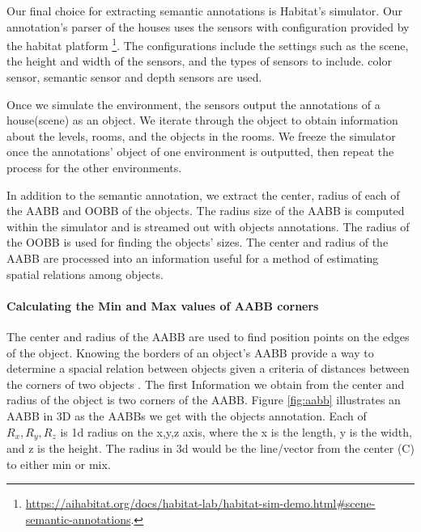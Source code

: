 Our final choice for extracting semantic annotations is Habitat's simulator. Our annotation's parser of the houses uses the sensors with configuration provided by the habitat platform \footnote{\url{https://aihabitat.org/docs/habitat-lab/habitat-sim-demo.html\#scene-semantic-annotations}.}. The configurations include the settings such as the scene, the height and width of the sensors, and the types of sensors to include. color sensor, semantic sensor and depth sensors are used. 

Once we simulate the environment, the sensors output the annotations of a house(scene) as an object. We iterate through the object to obtain information about the levels, rooms, and the objects in the rooms. We freeze the simulator once the annotations' object of one environment is outputted, then repeat the process for the other environments. 

In addition to the semantic annotation, we extract the center, radius of each of the AABB and OOBB of the objects. The radius size of the AABB is computed within the simulator and is streamed out with objects annotations. The radius of the OOBB is used for finding the objects' sizes. The center and radius of the AABB are processed into an information useful for a method of estimating spatial relations among objects. 

\paragraph{Calculating the Min and Max values of AABB corners}

The center and radius of the AABB are used to find position points on the edges of the object. Knowing the borders of an object's AABB provide a way to determine a spacial relation between objects given a criteria of distances between the corners of two objects . The first Information we obtain from the center and radius of the object is two corners of the AABB. Figure \ref{fig:aabb} illustrates an AABB in 3D as  the AABBs we get with the objects annotation. Each of $R_{x}, R_{y}, R_{z} $ is 1d radius on the x,y,z axis, where the  x is the length, y is the width, and z is the height. The radius in 3d would be the line/vector from the center (C) to either min or mix. 


